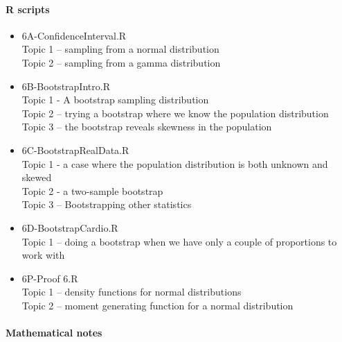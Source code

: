 \documentclass[12pt]{article}
\begin{document}
\paragraph*{R scripts}
\begin{itemize}
\item 6A-ConfidenceInterval.R\\
Topic 1 -- sampling from a normal distribution\\
Topic 2 -- sampling from a gamma distribution\\

\item 6B-BootstrapIntro.R\\
Topic 1 - A bootstrap sampling distribution\\
Topic 2 -- trying a bootstrap where we know the population distribution\\
Topic 3 -- the bootstrap reveals skewness in the population\\

\item 6C-BootstrapRealData.R\\
Topic 1 - a case where the population distribution is both unknown and skewed\\
Topic 2 - a two-sample bootstrap\\
Topic 3 -- Bootstrapping other statistics\\

\item 6D-BootstrapCardio.R\\
Topic 1 -- doing a bootstrap when we have only a couple of proportions to work with\\

\item 6P-Proof 6.R\\
Topic 1 -- density functions for normal distributions\\
Topic 2 -- moment generating function for a normal distribution\\







\end{itemize}

\pagebreak





\paragraph*{Mathematical notes}
\end{document}

